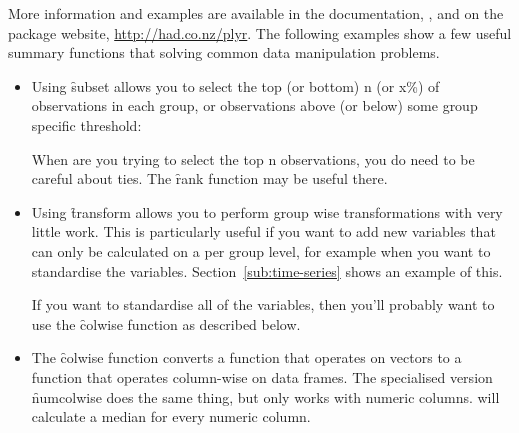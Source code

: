 More information and examples are available in the documentation, , and on the package website, \url{http://had.co.nz/plyr}.  The following examples show a few useful summary functions that solving common data manipulation problems.

\begin{itemize}
  \item Using \f{subset} allows you to select the top (or bottom) n (or x\%) of observations in each group, or observations above (or below) some group specific threshold:
  
    
  
  When are you trying to select the top n observations, you do need to be careful about ties.  The \f{rank} function may be useful there.
  
  \item Using \f{transform} allows you to perform group wise transformations with very little work.  This is particularly useful if you want to add new variables that can only be calculated on a per group level, for example when you want to standardise the variables. Section~\ref{sub:time-series} shows an example of this.
  
    
  
  If you want to standardise all of the variables, then you'll probably want to use the \f{colwise} function as described below.
  
  
  \item The \f{colwise} function converts a function that operates on vectors to a function that operates column-wise on data frames.  The specialised version \f{numcolwise} does the same thing, but only works with numeric columns.   will calculate a median for every numeric column. 
  
    
  

\end{itemize}
